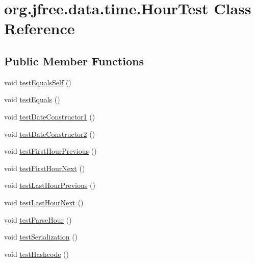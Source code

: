 \hypertarget{classorg_1_1jfree_1_1data_1_1time_1_1_hour_test}{}\section{org.\+jfree.\+data.\+time.\+Hour\+Test Class Reference}
\label{classorg_1_1jfree_1_1data_1_1time_1_1_hour_test}
\subsection*{Public Member Functions}
\begin{DoxyCompactItemize}
\item 
void \mbox{\hyperlink{classorg_1_1jfree_1_1data_1_1time_1_1_hour_test_a3f277a70b87132422fdfa2565c3c3c10}{test\+Equals\+Self}} ()
\item 
void \mbox{\hyperlink{classorg_1_1jfree_1_1data_1_1time_1_1_hour_test_aa64fadb093fd88bdaa2d108e1800472a}{test\+Equals}} ()
\item 
void \mbox{\hyperlink{classorg_1_1jfree_1_1data_1_1time_1_1_hour_test_ad0b7b065980738c23d2d3c1d1e0f8aa6}{test\+Date\+Constructor1}} ()
\item 
void \mbox{\hyperlink{classorg_1_1jfree_1_1data_1_1time_1_1_hour_test_aa5ce292f0b31f4a2f91955d10be0a20a}{test\+Date\+Constructor2}} ()
\item 
void \mbox{\hyperlink{classorg_1_1jfree_1_1data_1_1time_1_1_hour_test_a28b2a570408660cf305daa5ca0e14ce5}{test\+First\+Hour\+Previous}} ()
\item 
void \mbox{\hyperlink{classorg_1_1jfree_1_1data_1_1time_1_1_hour_test_a4279cf151e3ad151ad7bac63bf2c6eea}{test\+First\+Hour\+Next}} ()
\item 
void \mbox{\hyperlink{classorg_1_1jfree_1_1data_1_1time_1_1_hour_test_a7e0c2ff97509378312c4b16620e635c2}{test\+Last\+Hour\+Previous}} ()
\item 
void \mbox{\hyperlink{classorg_1_1jfree_1_1data_1_1time_1_1_hour_test_a6ed251ac1a5c9ef49b238b3f5c721baf}{test\+Last\+Hour\+Next}} ()
\item 
void \mbox{\hyperlink{classorg_1_1jfree_1_1data_1_1time_1_1_hour_test_a619c90c814d46a0b90c02d6f5007cc51}{test\+Parse\+Hour}} ()
\item 
void \mbox{\hyperlink{classorg_1_1jfree_1_1data_1_1time_1_1_hour_test_ab372c442437168b344ec7a4e92a8cc78}{test\+Serialization}} ()
\item 
void \mbox{\hyperlink{classorg_1_1jfree_1_1data_1_1time_1_1_hour_test_aa838e426169881b6cd7467d9840a7170}{test\+Hashcode}} ()

\end{DoxyCompactItemize}
